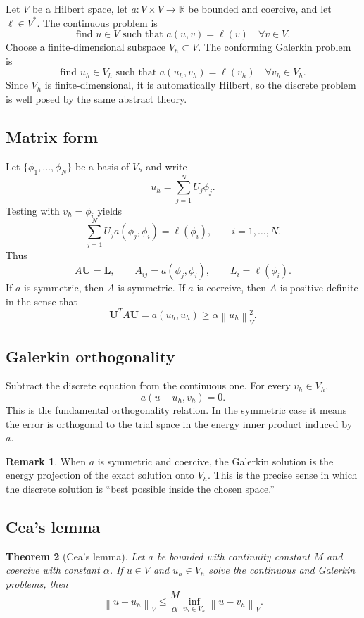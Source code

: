 \documentclass[11pt]{article}
\newtheorem{theorem}{Theorem}[section]
\theoremstyle{definition}
\newtheorem{remark}[theorem]{Remark}
\newcommand{\R}{\mathbb{R}}
\newcommand{\norm}[1]{\left\lVert #1\right\rVert}
\begin{document}
Let $V$ be a Hilbert space, let $a:V\times V\to\R$ be bounded and coercive, and let $\ell\in V^*$. The continuous problem is
\[
\text{find } u\in V \text{ such that } a(u,v)=\ell(v) \quad \forall v\in V.
\]
Choose a finite-dimensional subspace $V_h\subset V$. The conforming Galerkin problem is
\[
\text{find } u_h\in V_h \text{ such that } a(u_h,v_h)=\ell(v_h) \quad \forall v_h\in V_h.
\]
Since $V_h$ is finite-dimensional, it is automatically Hilbert, so the discrete problem is well posed by the same abstract theory.

\subsection{Matrix form}

Let $\{\phi_1,\dots,\phi_N\}$ be a basis of $V_h$ and write
\[
u_h = \sum_{j=1}^N U_j\phi_j.
\]
Testing with $v_h=\phi_i$ yields
\[
\sum_{j=1}^N U_j a(\phi_j,\phi_i)=\ell(\phi_i), \qquad i=1,\dots,N.
\]
Thus
\[
A\mathbf{U}=\mathbf{L},
\qquad
A_{ij}=a(\phi_j,\phi_i),
\qquad
L_i=\ell(\phi_i).
\]
If $a$ is symmetric, then $A$ is symmetric. If $a$ is coercive, then $A$ is positive definite in the sense that
\[
\mathbf{U}^T A \mathbf{U} = a(u_h,u_h) \ge \alpha \norm{u_h}_V^2.
\]

\subsection{Galerkin orthogonality}

Subtract the discrete equation from the continuous one. For every $v_h\in V_h$,
\[
a(u-u_h,v_h)=0.
\]
This is the fundamental orthogonality relation. In the symmetric case it means the error is orthogonal to the trial space in the energy inner product induced by $a$.

\begin{remark}
When $a$ is symmetric and coercive, the Galerkin solution is the energy projection of the exact solution onto $V_h$. This is the precise sense in which the discrete solution is ``best possible inside the chosen space.''
\end{remark}

\subsection{Cea's lemma}

\begin{theorem}[Cea's lemma]
Let $a$ be bounded with continuity constant $M$ and coercive with constant $\alpha$. If $u\in V$ and $u_h\in V_h$ solve the continuous and Galerkin problems, then
\[
\norm{u-u_h}_V \le \frac{M}{\alpha} \inf_{v_h\in V_h} \norm{u-v_h}_V.
\]
\end{theorem}
\end{document}
